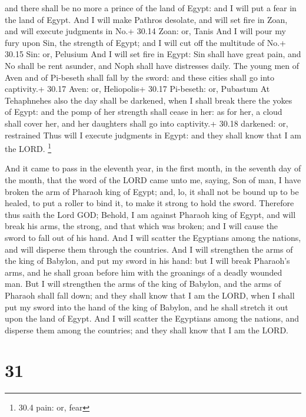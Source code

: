 and there shall be no more a prince of the land of Egypt: and I will put
a fear in the land of Egypt.  And I will make Pathros
desolate, and will set fire in Zoan, and will execute judgments in No.+
30.14 Zoan: or, Tanis  And I will pour my fury upon Sin,
the strength of Egypt; and I will cut off the multitude of No.+ 30.15
Sin: or, Pelusium  And I will set fire in Egypt: Sin shall
have great pain, and No shall be rent asunder, and Noph shall have
distresses daily.  The young men of Aven and of Pi-beseth
shall fall by the sword: and these cities shall go into captivity.+
30.17 Aven: or, Heliopolis+ 30.17 Pi-beseth: or, Pubastum 
At Tehaphnehes also the day shall be darkened, when I shall break there
the yokes of Egypt: and the pomp of her strength shall cease in her: as
for her, a cloud shall cover her, and her daughters shall go into
captivity.+ 30.18 darkened: or, restrained  Thus will I
execute judgments in Egypt: and they shall know that I am the LORD.
\footnote{30.4 pain: or, fear}

 And it came to pass in the eleventh year, in the first
month, in the seventh day of the month, that the word of the LORD came
unto me, saying,  Son of man, I have broken the arm of
Pharaoh king of Egypt; and, lo, it shall not be bound up to be healed,
to put a roller to bind it, to make it strong to hold the sword.
 Therefore thus saith the Lord GOD; Behold, I am against
Pharaoh king of Egypt, and will break his arms, the strong, and that
which was broken; and I will cause the sword to fall out of his hand.
 And I will scatter the Egyptians among the nations, and
will disperse them through the countries.  And I will
strengthen the arms of the king of Babylon, and put my sword in his
hand: but I will break Pharaoh's arms, and he shall groan before him
with the groanings of a deadly wounded man.  But I will
strengthen the arms of the king of Babylon, and the arms of Pharaoh
shall fall down; and they shall know that I am the LORD, when I shall
put my sword into the hand of the king of Babylon, and he shall stretch
it out upon the land of Egypt.  And I will scatter the
Egyptians among the nations, and disperse them among the countries; and
they shall know that I am the LORD.

\hypertarget{section-30}{%
\section{31}\label{section-30}}

